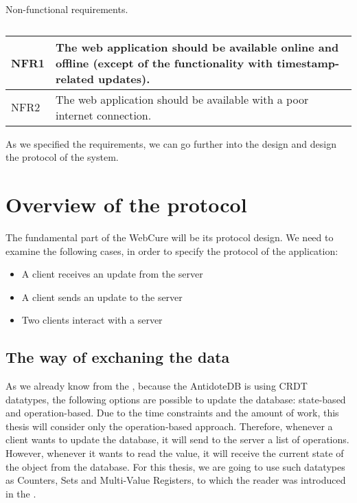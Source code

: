 \begin{table}[!htb]
\centering
\caption{Non-functional requirements.}
\label{table:req2}
\begin{tabular}{|p{1cm}|p{12cm}|}
\hline
NFR1 & The web application should be available online and offline (except of the functionality with timestamp-related updates). \\ \hline
NFR2 & The web application should be available with a poor internet connection. \\ \hline
\end{tabular}
\caption*{}
\end{table}

As we specified the requirements, we can go further into the design and design the protocol of the system.






























\section{Overview of the protocol}

The fundamental part of the WebCure will be its protocol design. We need to examine the following cases, in order to specify the protocol of the application:

    \begin{itemize}
        \item {A client receives an update from the server}
        \item {A client sends an update to the server}
        \item {Two clients interact with a server}
    \end{itemize}

\subsection{The way of exchaning the data}

As we already know from the , because the AntidoteDB is using CRDT datatypes, the following options are possible to update the database: state-based and operation-based. Due to the time constraints and the amount of work, this thesis will consider only the operation-based approach. Therefore, whenever a client wants to update the database, it will send to the server a list of operations. However, whenever it wants to read the value, it will receive the current state of the object from the database. For this thesis, we are going to use such datatypes as Counters, Sets and Multi-Value Registers, to which the reader was introduced in the .


